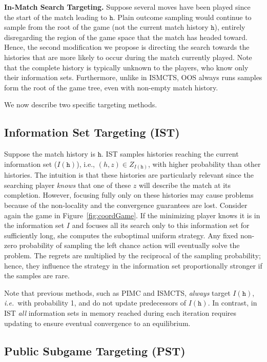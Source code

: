 \documentclass{aamas2015}
\newcommand{\tth}{\mathtt{h}}
\newcommand{\ie}{{\it i.e.}~}
\begin{document}
{\bf In-Match Search Targeting.}
Suppose several moves have been played since the start of the match leading to $\tth$. 
Plain outcome sampling would continue to sample from the root of the game (not the current match history $\tth$), entirely 
disregarding the region of the game space that the match has headed toward. 
Hence, the second modification we propose is directing the search towards the histories that are more likely to occur during the match currently played.
Note that the complete history is typically unknown to the players, who know only their information sets.
Furthermore, unlike in ISMCTS, OOS always runs samples form the root of the game tree, even with non-empty match history.

We now describe two specific targeting methods.

\subsection{Information Set Targeting (IST)}

Suppose the match history is $\tth$. IST samples histories reaching the current information set ($I(\tth)$), 
i.e., $(h,z) \in Z_{I(\tth)}$, with higher probability than other histories.
The intuition is that these histories are particularly 
relevant since the searching player {\it knows} that one of these $z$ will describe the match at its completion. 
However, focusing fully only on these histories may cause problems because of the non-locality and the convergence guarantees are lost.
Consider again the game in Figure~\ref{fig:coordGame}. 
If the minimizing player knows it is in the information set $I$ and focuses all its search only to this information set for sufficiently long, she computes the suboptimal uniform strategy.
Any fixed non-zero probability of sampling the left chance action will 
eventually solve the problem. The regrets are multiplied by the reciprocal of the sampling probability; hence, they influence the strategy 
in the information set proportionally stronger if the samples are rare.

Note that previous methods, such as PIMC and ISMCTS, {\it always} target $I(\tth)$, \ie with probability 1, and do not 
update predecessors of $I(\tth)$. In contrast, in IST {\it all} information sets in memory reached during each iteration requires updating 
to ensure eventual convergence to an equilibrium.

\subsection{Public Subgame Targeting (PST)}
\end{document}
